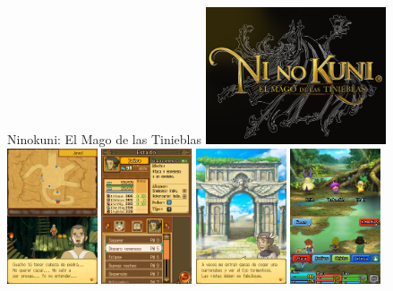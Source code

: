 \begin{frame}{Ninokuni: El Mago de las Tinieblas}
    \centering
    \includegraphics[width=0.4\textwidth]{imgs/ninokuni_preview.jpg}
    \vfill
    \includegraphics[width=0.2\textwidth]{imgs/nino1.png}
    \hfill
    \includegraphics[width=0.2\textwidth]{imgs/nino2.png}
    \hfill
    \includegraphics[width=0.2\textwidth]{imgs/nino3.png}
    \hfill
    \includegraphics[width=0.2\textwidth]{imgs/nino4.png}
\end{frame}


